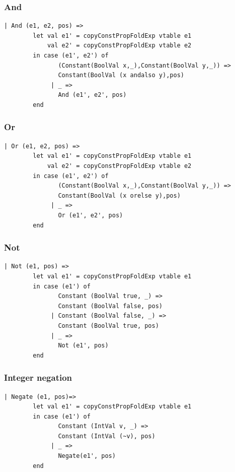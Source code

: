 \documentclass[11pt]{article}
\begin{document}
    \subsubsection{And} \label{ccpfand}
    \begin{lstlisting}[basicstyle=\small]
      | And (e1, e2, pos) =>
        let val e1' = copyConstPropFoldExp vtable e1
            val e2' = copyConstPropFoldExp vtable e2
        in case (e1', e2') of
               (Constant(BoolVal x,_),Constant(BoolVal y,_)) =>
               Constant(BoolVal (x andalso y),pos)
             | _ =>
               And (e1', e2', pos)
        end
    \end{lstlisting}

    \subsubsection{Or} \label{ccpfor}
    \begin{lstlisting}[basicstyle=\small]
      | Or (e1, e2, pos) =>
        let val e1' = copyConstPropFoldExp vtable e1
            val e2' = copyConstPropFoldExp vtable e2
        in case (e1', e2') of
               (Constant(BoolVal x,_),Constant(BoolVal y,_)) =>
               Constant(BoolVal (x orelse y),pos)
             | _ =>
               Or (e1', e2', pos)
        end
    \end{lstlisting}

    \subsubsection{Not} \label{ccpfnot}
    \begin{lstlisting}[basicstyle=\small]
      | Not (e1, pos) =>
        let val e1' = copyConstPropFoldExp vtable e1
        in case (e1') of
               Constant (BoolVal true, _) =>
               Constant (BoolVal false, pos)
             | Constant (BoolVal false, _) =>
               Constant (BoolVal true, pos)
             | _ =>
               Not (e1', pos)
        end
    \end{lstlisting}

    \subsubsection{Integer negation} \label{ccpfneg}
    \begin{lstlisting}[basicstyle=\small]
      | Negate (e1, pos)=>
        let val e1' = copyConstPropFoldExp vtable e1
        in case (e1') of
               Constant (IntVal v, _) =>
               Constant (IntVal (~v), pos)
             | _ =>
               Negate(e1', pos)
        end
    \end{lstlisting}
\end{document}
